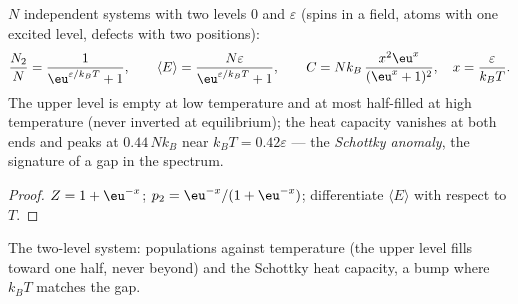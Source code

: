 \begin{proposition}\label{prop:b2:boltzmann-factor:twolevel}
$N$ independent systems with two levels $0$ and $\varepsilon$ (spins in a
field, atoms with one excited level, defects with two positions):
\[
\frac{N_2}{N} = \frac{1}{\eu^{\varepsilon/k_BT} + 1}, \qquad
\langle E\rangle = \frac{N\varepsilon}{\eu^{\varepsilon/k_BT} + 1}, \qquad
C = Nk_B\,\frac{x^2\eu^x}{(\eu^x + 1)^2}, \quad x = \frac{\varepsilon}{k_BT} .
\]
The upper level is empty at low temperature and at most half-filled at
high temperature (never inverted at equilibrium); the heat capacity
vanishes at both ends and peaks at $0.44\,Nk_B$ near $k_BT = 0.42
\varepsilon$ --- the \emph{Schottky anomaly}, the
signature of a gap in the spectrum.
\end{proposition}

\begin{proof}
$Z = 1 + \eu^{-x}$; $p_2 = \eu^{-x}/(1 + \eu^{-x})$; differentiate $\langle
E\rangle$ with respect to $T$.
\end{proof}

\begin{omfigure}

{\small The two-level system: populations against temperature (the
upper level fills toward one half, never beyond) and the Schottky heat
capacity, a bump where $k_BT$ matches the gap.}
\end{omfigure}

